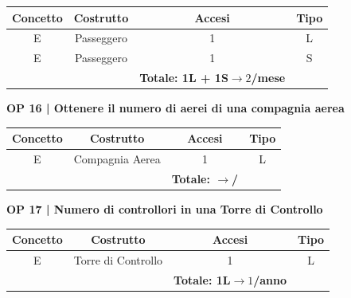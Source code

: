 \begin{tabular}{ c c c c}
	\hline
	\textbf{Concetto} & \textbf{Costrutto} & \textbf{Accesi} & \textbf{Tipo}\\
	\hline
	\textsf{\small E} & \textsf{\small Passeggero} & \textsf{\small 1} &  \textsf{\small L}\\
	\hline
	\textsf{\small E} & \textsf{\small Passeggero} & \textsf{\small 1} &  \textsf{\small S}\\ %
	\hline
	\textsf{\small } & \textsf{\small } & \textbf{Totale: 1L + 1S$\rightarrow 2$/mese } \textsf{\small } & \textsf{\small }\\
	\hline
\end{tabular}

\vspace{.6cm}


\textbf{\small OP 16 | Ottenere il numero di aerei di una compagnia aerea}\\

\begin{tabular}{ c c c c}
	\hline
	\textbf{Concetto} & \textbf{Costrutto} & \textbf{Accesi} & \textbf{Tipo}\\
	\hline
	\textsf{\small E} & \textsf{\small Compagnia Aerea} & \textsf{\small 1} &  \textsf{\small L}\\
	\hline
	\textsf{\small } & \textsf{\small } & \textbf{Totale: $\rightarrow $/ } \textsf{\small } & \textsf{\small }\\
	\hline
\end{tabular}

\vspace{.6cm}


\textbf{\small OP 17 | Numero di controllori in una Torre di Controllo}\\

\begin{tabular}{ c c c c}
	\hline
	\textbf{Concetto} & \textbf{Costrutto} & \textbf{Accesi} & \textbf{Tipo}\\
	\hline
	\textsf{\small E} & \textsf{\small Torre di Controllo} & \textsf{\small 1} &  \textsf{\small L}\\
	\hline
	\textsf{\small } & \textsf{\small } & \textbf{Totale: 1L$\rightarrow 1$/anno } \textsf{\small } & \textsf{\small }\\
	\hline
\end{tabular}

